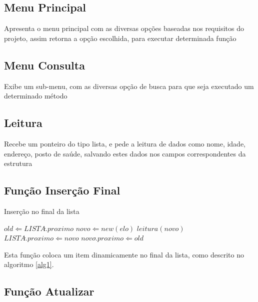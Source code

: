 \documentclass[12pt]{article}
\begin{document}
\subsection{Menu Principal}

Apresenta o menu principal com as diversas opções baseadas nos requisitos do projeto,
assim retorna a opção escolhida, para executar determinada função 


\subsection{Menu Consulta}

Exibe um sub-menu, com as diversas opção de busca para que seja executado um determinado
método


\subsection{Leitura}

Recebe um ponteiro do tipo lista, e pede a leitura de dados como nome, idade, 
endereço, posto de saúde, salvando estes dados nos campos correspondentes
da estrutura

\subsection{Função Inserção Final}


\begin{algorithm}                      %
\caption{Inserção no final da lista}          %
\label{alg1}                           %
\begin{algorithmic}                    %
    \STATE $old \Leftarrow LISTA\hat.proximo$
    \STATE $novo \Leftarrow new(elo)$
    \STATE $leitura(novo)$
    \STATE $LISTA\hat.proximo \Leftarrow novo$
    \STATE $novo\hat.proximo \Leftarrow old$
\end{algorithmic}
\end{algorithm}

Esta função coloca um item dinamicamente no final da lista, como descrito no algoritmo \ref{alg1}.



\subsection{Função Atualizar}
\end{document}
